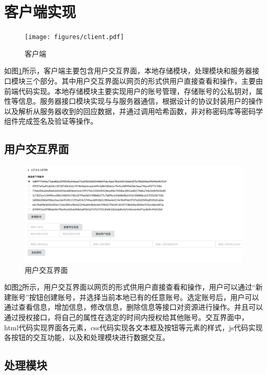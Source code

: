 \section{客户端实现}

\begin{figure}[htb]
\centering
\texttt{[image: figures/client.pdf]}
\caption{客户端}
\label{fig:client}
\end{figure}

如图\ref{fig:client}所示，客户端主要包含用户交互界面，本地存储模块，处理模块和服务器接口模块三个部分。其中用户交互界面以网页的形式供用户直接查看和操作，主要由前端代码实现。本地存储模块主要实现用户的账号管理，存储账号的公私钥对，属性等信息。服务器接口模块实现与与服务器通信，根据设计的协议封装用户的操作以及解析从服务器收到的回应数据，并通过调用哈希函数，非对称密码库等密码学组件完成签名及验证等操作。

\subsection{用户交互界面}

\begin{figure}[H]
\centering
\includegraphics[width=12cm, keepaspectratio]{figures/ui.png}
\caption{用户交互界面}
\label{fig:ui}
\end{figure}

如图\ref{fig:ui}所示，用户交互界面以网页的形式供用户直接查看和操作，用户可以通过“新建账号”按钮创建账号，并选择当前本地已有的任意账号。选定账号后，用户可以通过查看信息，增加信息，修改信息，删除信息等接口对资源进行操作。并且可以通过授权接口，将自己的属性在选定的时间内授权给其他账号。交互界面中，html代码实现界面各元素，css代码实现各文本框及按钮等元素的样式，js代码实现各按钮的交互功能，以及和处理模块进行数据交互。

\subsection{处理模块}


